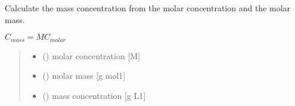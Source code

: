 \documentclass[letterpaper,10pt,english]{sphinxmanual}
\begin{document}
\begin{fulllineitems}
\label{\detokenize{03_absorption_coefficient:skinoptics.absorption_coefficient.Cmass_from_Cmolar}}
\pysigstartsignatures
{}
\pysigstopsignatures
\sphinxAtStartPar
Calculate the mass concentration from the molar concentration and the molar mass.

\sphinxAtStartPar
\(C_{mass} = M C_{molar}\)
\begin{quote}\begin{description}
\begin{itemize}
\item {} 
\sphinxAtStartPar
{} () \textendash{} molar concentration {[}M{]}

\item {} 
\sphinxAtStartPar
{} () \textendash{} molar mass {[}g mol\sphinxhyphen{}1{]}

\end{itemize}

\sphinxAtStartPar
\begin{itemize}
\item {} 
\sphinxAtStartPar
{} () \textendash{} mass concentration {[}g L\sphinxhyphen{}1{]}

\end{itemize}


\end{description}\end{quote}

\end{fulllineitems}

\end{document}
